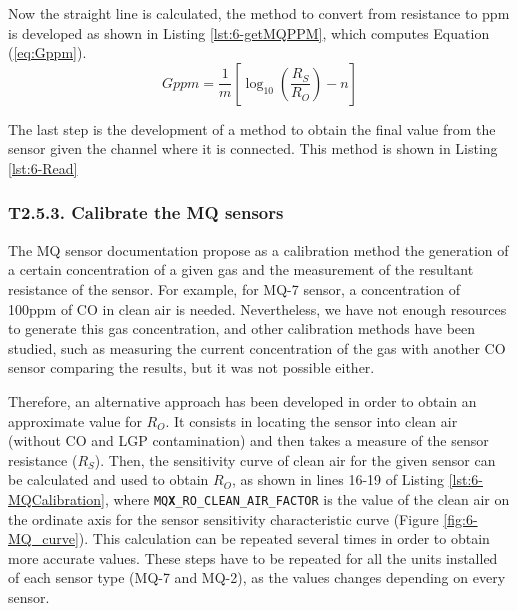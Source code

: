 Now the straight line is calculated, the method to convert from resistance to ppm is developed as shown in Listing \ref{lst:6-getMQPPM}, which computes Equation (\ref{eq:Gppm}). 
\begin{equation} \label{eq:Gppm}
Gppm=\frac {1}{m} \left[ \log_{10}{ \left( \frac{{R}_{S}}{{R}_{O}} \right)}-n \right] 
\end{equation}



The last step is the development of a method to obtain the final value from the sensor given the channel where it is connected. This method is shown in Listing \ref{lst:6-Read}




\subsubsection{T2.5.3. Calibrate the MQ sensors}
The MQ sensor documentation propose as a calibration method the generation of a certain concentration of a given gas and the measurement of the resultant resistance of the sensor. For example, for MQ-7 sensor, a concentration of 100ppm of CO in clean air is needed. Nevertheless, we have not enough resources to generate this gas concentration, and other calibration methods have been studied, such as measuring the current concentration of the gas with another CO sensor comparing the results, but it was not possible either. 

Therefore, an alternative approach has been developed in order to obtain an approximate value for ${R}_{O}$. It consists in locating the sensor into clean air (without CO and LGP contamination) and then takes a measure of the sensor resistance (${R}_{S}$). Then, the sensitivity curve of clean air for the given sensor can be calculated and used to obtain ${R}_{O}$, as shown in lines 16-19 of Listing \ref{lst:6-MQCalibration}, where \texttt{MQ\textbf{X}\_RO\_CLEAN\_AIR\_FACTOR} is the value of the clean air on the ordinate axis for the sensor sensitivity characteristic curve (Figure \ref{fig:6-MQ_curve}). This calculation can be repeated several times in order to obtain more accurate values. These steps have to be repeated for all the units installed of each sensor type (MQ-7 and MQ-2), as the values changes depending on every sensor.

